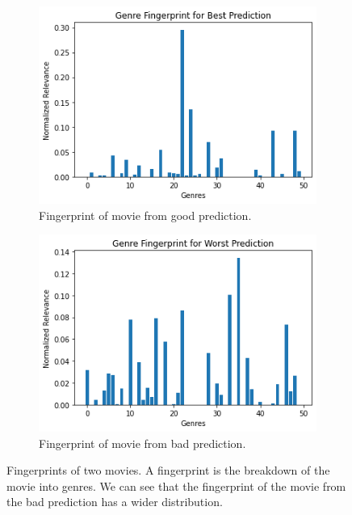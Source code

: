 \documentclass[letterpaper, 10 pt, conference]{ieeeconf}  %
\begin{document}
\begin{figure}[h]
   \begin{subfigure}[b]{\columnwidth}
      \includegraphics[width=\linewidth]{./figs/bestfingerprint.png}
      \caption{Fingerprint of movie from good prediction.}
   \end{subfigure}
   \hfill
   \begin{subfigure}[b]{\columnwidth}
      \includegraphics[width=\linewidth]{./figs/worstfingerprint.png}
      \caption{Fingerprint of movie from bad prediction.}
   \end{subfigure}
   \caption{Fingerprints of two movies. A fingerprint is the breakdown of the movie into genres. We can see that the fingerprint of the movie from the bad prediction has a wider distribution.}
\end{figure}
\end{document}
